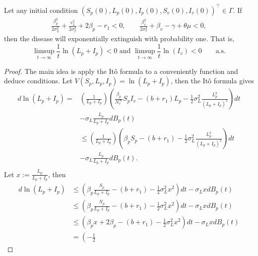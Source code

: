 \begin{theorem}\label{thm::NoiseExtinction}
	Let	any initial condition $(S_p(0), L_p(0), I_p(0), S_v(0), I_v(0)) ^ \top \in \Gamma$. If
	\begin{align*}
		\frac{\beta_p ^ 2}{2\sigma_L ^ 2} + 
		\frac{r_2^2}{2\sigma_I^2} + 
		2 \beta_p - r_1 < 0,
		\qquad
		\frac{\beta_v^2}{2\sigma_v^2} + 
		\beta_v - \gamma + \theta \mu < 0,
	\end{align*}
	 then the disease will exponentially extinguish with probability one. That 
	 is, 
	\begin{equation*}
		\limsup_{t \to \infty}
		\frac{1}{t}
		\ln(L_p + I_p) < 0 \text{ and }
		\limsup_{t \to \infty}
		\frac{1}{t}\ln(I_v)< 0\qquad\mbox{a.s.}
	\end{equation*}
\end{theorem}
\begin{proof}
	The main idea is apply the It\^{o} formula to a conveniently function and 
	deduce conditions. Let 
	$
		V(S_p, L_p, I_p) = \ln(L_p + I_p)
	$, then the It\^{o} formula gives
	\begin{align*}
		d \ln(L_p+I_p) 
			=&
				\left(
					\frac{1}{L_p + I_p}
				\right)
				\left(
					\frac{\beta_p}{N_v^\infty} 
					S_p I_v - (b + r_1) L_p
					-\frac{1}{2}
					\sigma_L^2 \frac{L_p^2}{(L_p+I_p)^2}
				\right)dt
			\\
			&-
				\sigma_L \frac{L_p}{L_p+I_p}dB_p(t)\\
			&\leq 
				\left(
					\frac{1}{L_p+I_p}
				\right)
				\left(
					\beta_p S_p - (b + r_1) -
					\frac{1}{2}
					\sigma_L^2
					\frac{L_p^2}{(L_p+I_p)^2}
				\right)dt
			\\
			&-
				\sigma_L \frac{L_p}{L_p + I_p} dB_p(t).
			\\
	\end{align*}
	Let $x:=\frac{L_p}{L_p + I_p}$, then
		\begin{align*}
		d \ln(L_p + I_p) 
			&\leq 
				\left(
					\beta_p 
					\frac{S_p}{L_p + I_p} - 
					(b + r_1) - 
					\frac{1}{2}
					\sigma_L ^ 2 x^2
				\right)dt - \sigma_L x dB_p(t)
			\\
			&\leq
				\left(\beta_p
					\frac{N_p}{L_p + I_p} - (b+r_1) - 
					\frac{1}{2} 
					\sigma_L^2 x^2
				\right) dt - 
				\sigma_L xdB_p(t)
			\\
			&\leq
				\left(
					\beta_p x + 2\beta_p - 
					(b + r_1) - 
					\frac{1}{2}
					\sigma_L ^ 2 x^2
				\right) dt - 
				\sigma_L xdB_p(t)
			\\
			&=
				\left(
					-\frac{1}{2}

\end{align*}
\end{proof}
